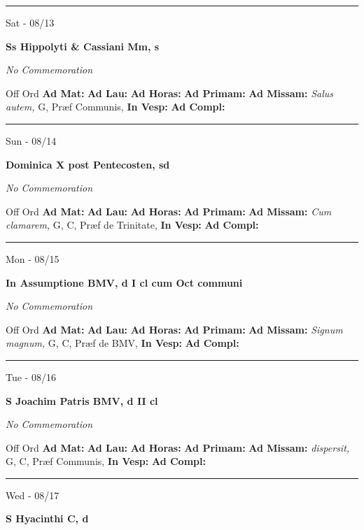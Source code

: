 \documentclass[letterpaper, 10pt]{article}
\begin{document}
\hrule
\begin{center}
Sat - 08/13
\end{center}\textbf{ \large Ss Hippolyti \& Cassiani Mm, \textnormal{\normalsize s}}

\textit{No Commemoration}\begin{justify}
Off Ord
\textbf{Ad Mat: }
\textbf{Ad Lau: }
\textbf{Ad Horas: }
\textbf{Ad Primam: }
\textbf{Ad Missam:} \textit{Salus autem, } G, Præf Communis, 
\textbf{In Vesp: }
\textbf{Ad Compl: }\end{justify}



\hrule
\begin{center}
Sun - 08/14
\end{center}\textbf{ \large Dominica X post Pentecosten, \textnormal{\normalsize sd}}

\textit{No Commemoration}\begin{justify}
Off Ord
\textbf{Ad Mat: }
\textbf{Ad Lau: }
\textbf{Ad Horas: }
\textbf{Ad Primam: }
\textbf{Ad Missam:} \textit{Cum clamarem, } G, C, Præf de Trinitate, 
\textbf{In Vesp: }
\textbf{Ad Compl: }\end{justify}



\hrule
\begin{center}
Mon - 08/15
\end{center}\textbf{ \large In Assumptione BMV, \textnormal{\normalsize d I cl cum Oct communi}}

\textit{No Commemoration}\begin{justify}
Off Ord
\textbf{Ad Mat: }
\textbf{Ad Lau: }
\textbf{Ad Horas: }
\textbf{Ad Primam: }
\textbf{Ad Missam:} \textit{Signum magnum, } G, C, Præf de BMV, 
\textbf{In Vesp: }
\textbf{Ad Compl: }\end{justify}



\hrule
\begin{center}
Tue - 08/16
\end{center}\textbf{ \large S Joachim Patris BMV, \textnormal{\normalsize d II cl}}

\textit{No Commemoration}\begin{justify}
Off Ord
\textbf{Ad Mat: }
\textbf{Ad Lau: }
\textbf{Ad Horas: }
\textbf{Ad Primam: }
\textbf{Ad Missam:} \textit{dispersit, } G, C, Præf Communis, 
\textbf{In Vesp: }
\textbf{Ad Compl: }\end{justify}



\hrule
\begin{center}
Wed - 08/17
\end{center}\textbf{ \large S Hyacinthi C, \textnormal{\normalsize d}}
\end{document}
